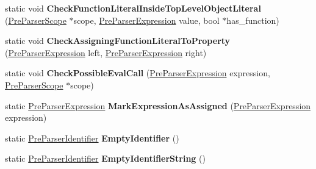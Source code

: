 \begin{DoxyCompactItemize}
\item 
\hypertarget{classv8_1_1internal_1_1_pre_parser_traits_a7764c591351abc685902c39d8f98d0d3}{}static void {\bfseries Check\+Function\+Literal\+Inside\+Top\+Level\+Object\+Literal} (\hyperlink{classv8_1_1internal_1_1_pre_parser_scope}{Pre\+Parser\+Scope} $\ast$scope, \hyperlink{classv8_1_1internal_1_1_pre_parser_expression}{Pre\+Parser\+Expression} value, bool $\ast$has\+\_\+function)\label{classv8_1_1internal_1_1_pre_parser_traits_a7764c591351abc685902c39d8f98d0d3}

\item 
\hypertarget{classv8_1_1internal_1_1_pre_parser_traits_ac2b07bf4032c386ed8810a6ffb3d7800}{}static void {\bfseries Check\+Assigning\+Function\+Literal\+To\+Property} (\hyperlink{classv8_1_1internal_1_1_pre_parser_expression}{Pre\+Parser\+Expression} left, \hyperlink{classv8_1_1internal_1_1_pre_parser_expression}{Pre\+Parser\+Expression} right)\label{classv8_1_1internal_1_1_pre_parser_traits_ac2b07bf4032c386ed8810a6ffb3d7800}

\item 
\hypertarget{classv8_1_1internal_1_1_pre_parser_traits_a60ecea53db04600a97ac4871188f07cf}{}static void {\bfseries Check\+Possible\+Eval\+Call} (\hyperlink{classv8_1_1internal_1_1_pre_parser_expression}{Pre\+Parser\+Expression} expression, \hyperlink{classv8_1_1internal_1_1_pre_parser_scope}{Pre\+Parser\+Scope} $\ast$scope)\label{classv8_1_1internal_1_1_pre_parser_traits_a60ecea53db04600a97ac4871188f07cf}

\item 
\hypertarget{classv8_1_1internal_1_1_pre_parser_traits_a0ca471f95500b1ad12d6b4ffa205b7f3}{}static \hyperlink{classv8_1_1internal_1_1_pre_parser_expression}{Pre\+Parser\+Expression} {\bfseries Mark\+Expression\+As\+Assigned} (\hyperlink{classv8_1_1internal_1_1_pre_parser_expression}{Pre\+Parser\+Expression} expression)\label{classv8_1_1internal_1_1_pre_parser_traits_a0ca471f95500b1ad12d6b4ffa205b7f3}

\item 
\hypertarget{classv8_1_1internal_1_1_pre_parser_traits_a5129a407bdff898355049d82ab869596}{}static \hyperlink{classv8_1_1internal_1_1_pre_parser_identifier}{Pre\+Parser\+Identifier} {\bfseries Empty\+Identifier} ()\label{classv8_1_1internal_1_1_pre_parser_traits_a5129a407bdff898355049d82ab869596}

\item 
\hypertarget{classv8_1_1internal_1_1_pre_parser_traits_a84debed7c42d79a6179c14ad5ead6304}{}static \hyperlink{classv8_1_1internal_1_1_pre_parser_identifier}{Pre\+Parser\+Identifier} {\bfseries Empty\+Identifier\+String} ()\label{classv8_1_1internal_1_1_pre_parser_traits_a84debed7c42d79a6179c14ad5ead6304}


\end{DoxyCompactItemize}
